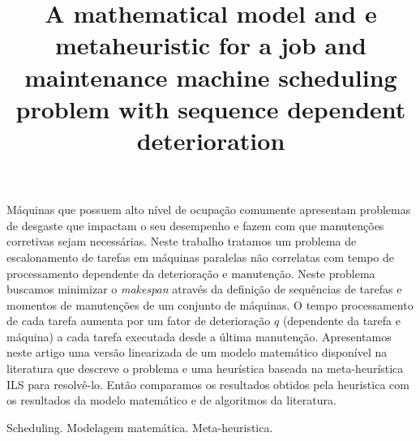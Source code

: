 \documentclass[a4paper,11pt]{article}
\begin{document}
\title{A mathematical model and e metaheuristic for a job and maintenance machine scheduling problem with sequence dependent deterioration} 

\maketitle
\thispagestyle{fancy}

\author{
}

\author{ 
}

\vspace{8mm}
\begin{resumo}
M\'aquinas que possuem alto n\'ivel de ocupa\c c\~ao comumente apresentam problemas de desgaste que impactam o seu desempenho e fazem com que manuten\c c\~oes corretivas sejam necess\'arias. Neste trabalho tratamos um problema de escalonamento de tarefas em m\'aquinas paralelas n\~ao correlatas com tempo de processamento dependente da deteriora\c c\~ao e manuten\c c\~ao. Neste problema buscamos minimizar o \emph{makespan} atrav\'es da defini\c c\~ao de sequ\^encias de tarefas e momentos de manuten\c c\~oes de um conjunto de m\'aquinas. O tempo processamento de cada tarefa aumenta por um fator de deteriora\c c\~ao $q$ (dependente da tarefa e m\'aquina) a cada tarefa executada desde a \'ultima manuten\c c\~ao. Apresentamos neste artigo uma vers\~ao linearizada de um modelo matem\'atico dispon\'ivel na literatura que descreve o problema e uma heur\'istica baseada na meta-heur\'istica ILS para resolv\^e-lo. Ent\~ao comparamos os resultados obtidos pela heuristica com os resultados da modelo matem\'atico e de algoritmos da literatura. 
 \end{resumo}

\bigskip
\begin{palchaves}
Scheduling. Modelagem matem\'atica. Meta-heuristica.

\bigskip
{}
\end{palchaves}


\vspace{8mm}
\end{document}
